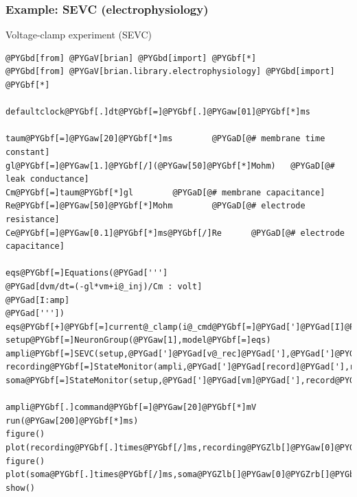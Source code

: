 \documentclass[letterpaper,10pt,english]{manual}
\begin{document}
\resetcurrentobjects
\hypertarget{--doc-examples-electrophysiology_SEVC}{}

\hypertarget{index-37}{}\subsubsection{Example: SEVC (electrophysiology)}

Voltage-clamp experiment (SEVC)

\begin{Verbatim}[commandchars=@\[\]]
@PYGbd[from] @PYGaV[brian] @PYGbd[import] @PYGbf[*]
@PYGbd[from] @PYGaV[brian.library.electrophysiology] @PYGbd[import] @PYGbf[*]

defaultclock@PYGbf[.]dt@PYGbf[=]@PYGbf[.]@PYGaw[01]@PYGbf[*]ms

taum@PYGbf[=]@PYGaw[20]@PYGbf[*]ms        @PYGaD[@# membrane time constant]
gl@PYGbf[=]@PYGaw[1.]@PYGbf[/](@PYGaw[50]@PYGbf[*]Mohm)   @PYGaD[@# leak conductance]
Cm@PYGbf[=]taum@PYGbf[*]gl        @PYGaD[@# membrane capacitance]
Re@PYGbf[=]@PYGaw[50]@PYGbf[*]Mohm        @PYGaD[@# electrode resistance]
Ce@PYGbf[=]@PYGaw[0.1]@PYGbf[*]ms@PYGbf[/]Re      @PYGaD[@# electrode capacitance]

eqs@PYGbf[=]Equations(@PYGad[''']
@PYGad[dvm/dt=(-gl*vm+i@_inj)/Cm : volt]
@PYGad[I:amp]
@PYGad['''])
eqs@PYGbf[+]@PYGbf[=]current@_clamp(i@_cmd@PYGbf[=]@PYGad[']@PYGad[I]@PYGad['],Re@PYGbf[=]Re,Ce@PYGbf[=]Ce)
setup@PYGbf[=]NeuronGroup(@PYGaw[1],model@PYGbf[=]eqs)
ampli@PYGbf[=]SEVC(setup,@PYGad[']@PYGad[v@_rec]@PYGad['],@PYGad[']@PYGad[I]@PYGad['],@PYGaw[1]@PYGbf[*]kHz,gain@PYGbf[=]@PYGaw[250]@PYGbf[*]nS,gain2@PYGbf[=]@PYGaw[50]@PYGbf[*]nS@PYGbf[/]ms)
recording@PYGbf[=]StateMonitor(ampli,@PYGad[']@PYGad[record]@PYGad['],record@PYGbf[=]@PYGaA[True])
soma@PYGbf[=]StateMonitor(setup,@PYGad[']@PYGad[vm]@PYGad['],record@PYGbf[=]@PYGaA[True])

ampli@PYGbf[.]command@PYGbf[=]@PYGaw[20]@PYGbf[*]mV
run(@PYGaw[200]@PYGbf[*]ms)
figure()
plot(recording@PYGbf[.]times@PYGbf[/]ms,recording@PYGZlb[]@PYGaw[0]@PYGZrb[]@PYGbf[/]nA,@PYGad[']@PYGad[k]@PYGad['])
figure()
plot(soma@PYGbf[.]times@PYGbf[/]ms,soma@PYGZlb[]@PYGaw[0]@PYGZrb[]@PYGbf[/]mV,@PYGad[']@PYGad[b]@PYGad['])
show()
\end{Verbatim}

\resetcurrentobjects
\hypertarget{--doc-examples-electrophysiology_voltageclamp}{}
\end{document}

